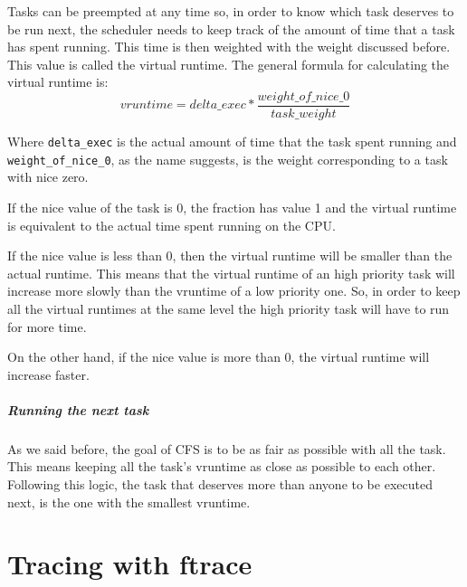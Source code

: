 \documentclass[10pt]{book}
\begin{document}
Tasks can be preempted at any time so, in order to know which task deserves to be run next, the scheduler needs to keep track of the amount of time that a task has spent running. This time is then weighted with the weight discussed before. This value is called the virtual runtime. The general formula for calculating the virtual runtime is:
\begin{equation}
    vruntime = delta\_exec * \frac{weight\_of\_nice\_0}{task\_weight}
\end{equation}

Where \verb|delta_exec| is the actual amount of time that the task spent running and \verb|weight_of_nice_0|, as the name suggests, is the weight corresponding to a task with nice zero.

If the nice value of the task is 0, the fraction has value 1 and the virtual runtime is equivalent to the actual time spent running on the CPU.

If the nice value is less than 0, then the virtual runtime will be smaller than the actual runtime. This means that the virtual runtime of an high priority task will increase more slowly than the vruntime of a low priority one. So, in order to keep all the virtual runtimes at the same level the high priority task will have to run for more time.

On the other hand, if the nice value is more than 0, the virtual runtime will increase faster.

\paragraph{Running the next task}

As we said before, the goal of CFS is to be as fair as possible with all the task. This means keeping all the task's vruntime as close as possible to each other. Following this logic, the task that deserves more than anyone to be executed next, is the one with the smallest vruntime.


\chapter{Tracing with ftrace} %
\label{chap:ftrace}
\end{document}
